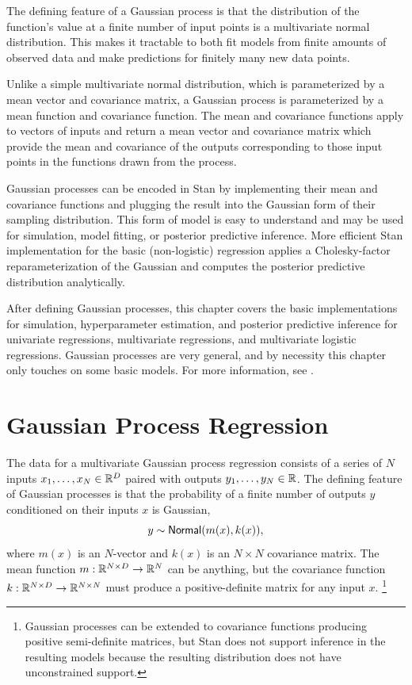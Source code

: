 The defining feature of a Gaussian process is that the distribution of
the function's value at a finite number of input points is a
multivariate normal distribution.  This makes it tractable to both fit
models from finite amounts of observed data and make predictions for
finitely many new data points. 

Unlike a simple multivariate normal distribution, which is
parameterized by a mean vector and covariance matrix, a Gaussian
process is parameterized by a mean function and covariance function.
The mean and covariance functions apply to vectors of inputs and
return a mean vector and covariance matrix which provide the mean and
covariance of the outputs corresponding to those input points in the
functions drawn from the process.

Gaussian processes can be encoded in Stan by implementing their mean
and covariance functions and plugging the result into the Gaussian
form of their sampling distribution.  This form of model is easy to
understand and may be used for simulation, model fitting, or posterior
predictive inference.  More efficient Stan implementation for the
basic (non-logistic) regression applies a Cholesky-factor
reparameterization of the Gaussian and computes the posterior
predictive distribution analytically.

After defining Gaussian processes, this chapter covers the basic
implementations for simulation, hyperparameter estimation, and
posterior predictive inference for univariate regressions,
multivariate regressions, and multivariate logistic regressions.
Gaussian processes are very general, and by necessity this chapter
only touches on some basic models.  For more information, see
\citep{RasmussenWilliams:2006}.


\section{Gaussian Process Regression}

The data for a multivariate Gaussian process regression consists of a
series of $N$ inputs $x_1,\ldots,x_N \in \reals^D$ paired with outputs
$y_1,\ldots,y_N \in \reals$.  The defining feature of Gaussian
processes is that the probability of a finite number of outputs $y$
conditioned on their inputs $x$ is Gaussian,
\[
y \sim \distro{Normal}(m(x),k(x)),
\] 
where $m(x)$ is an $N$-vector and $k(x)$ is an $N \times N$
covariance matrix.  The mean function $m : \reals^{N \times D}
\rightarrow \reals^{N}$ can be anything, but the covariance function
$k : \reals^{N \times D} \rightarrow \reals^{N \times N}$ must produce
a positive-definite matrix for any input $x$.%
%
\footnote{Gaussian processes can be extended to covariance functions
  producing positive semi-definite matrices, but Stan does not support
  inference in the resulting models because the resulting distribution
  does not have unconstrained support.}

